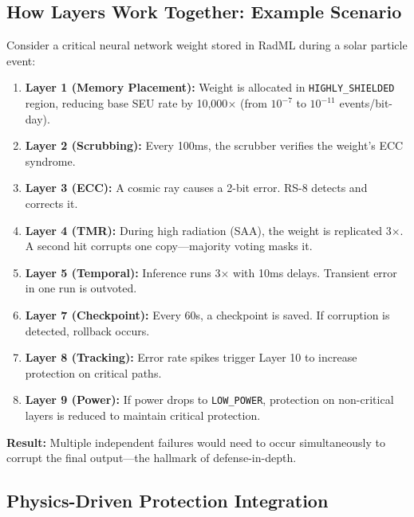 \documentclass[11pt,a4paper]{article}
\begin{document}
\subsection{How Layers Work Together: Example Scenario}

Consider a critical neural network weight stored in RadML during a solar particle event:

\begin{enumerate}
    \item \textbf{Layer 1 (Memory Placement):} Weight is allocated in \texttt{HIGHLY\_SHIELDED} region, reducing base SEU rate by 10,000$\times$ (from $10^{-7}$ to $10^{-11}$ events/bit-day).

    \item \textbf{Layer 2 (Scrubbing):} Every 100ms, the scrubber verifies the weight's ECC syndrome.

    \item \textbf{Layer 3 (ECC):} A cosmic ray causes a 2-bit error. RS-8 detects and corrects it.

    \item \textbf{Layer 4 (TMR):} During high radiation (SAA), the weight is replicated 3$\times$. A second hit corrupts one copy---majority voting masks it.

    \item \textbf{Layer 5 (Temporal):} Inference runs 3$\times$ with 10ms delays. Transient error in one run is outvoted.

    \item \textbf{Layer 7 (Checkpoint):} Every 60s, a checkpoint is saved. If corruption is detected, rollback occurs.

    \item \textbf{Layer 8 (Tracking):} Error rate spikes trigger Layer 10 to increase protection on critical paths.

    \item \textbf{Layer 9 (Power):} If power drops to \texttt{LOW\_POWER}, protection on non-critical layers is reduced to maintain critical protection.
\end{enumerate}

\textbf{Result:} Multiple independent failures would need to occur simultaneously to corrupt the final output---the hallmark of defense-in-depth.

\subsection{Physics-Driven Protection Integration}
\end{document}
